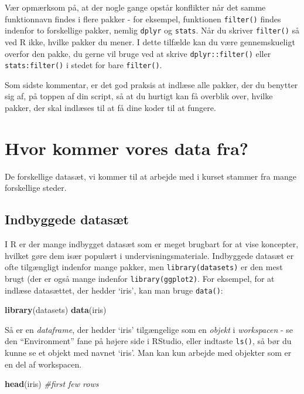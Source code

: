 \documentclass[
]{book}
\newenvironment{Shaded}{\begin{snugshade}}{\end{snugshade}}
\newcommand{\CommentTok}[1]{\textcolor[rgb]{0.56,0.35,0.01}{\textit{#1}}}
\newcommand{\FunctionTok}[1]{\textcolor[rgb]{0.13,0.29,0.53}{\textbf{#1}}}
\newcommand{\NormalTok}[1]{#1}
\begin{document}
Vær opmærksom på, at der nogle gange opstår konflikter når det samme funktionnavn findes i flere pakker - for eksempel, funktionen \texttt{filter()} findes indenfor to forskellige pakker, nemlig \texttt{dplyr} og \texttt{stats}. Når du skriver \texttt{filter()} så ved R ikke, hvilke pakker du mener. I dette tilfælde kan du være gennemskueligt overfor den pakke, du gerne vil bruge ved at skrive \texttt{dplyr::filter()} eller \texttt{stats:filter()} i stedet for bare \texttt{filter()}.

Som sidste kommentar, er det god praksis at indlæse alle pakker, der du benytter sig af, på toppen af din script, så at du hurtigt kan få overblik over, hvilke pakker, der skal indlæses til at få dine koder til at fungere.

\section{Hvor kommer vores data fra?}\label{hvor-kommer-vores-data-fra}

De forskellige datasæt, vi kommer til at arbejde med i kurset stammer fra mange forskellige steder.

\subsection{Indbyggede datasæt}\label{indbyggede-datasuxe6t}

I R er der mange indbygget datasæt som er meget brugbart for at vise koncepter, hvilket gøre dem især populært i undervisningsmateriale. Indbyggede datasæt er ofte tilgængligt indenfor mange pakker, men \texttt{library(datasets)} er den mest brugt (der er også mange indenfor \texttt{library(ggplot2)}. For eksempel, for at indlæse datasættet, der hedder `iris', kan man bruge \texttt{data()}:

\begin{Shaded}
\begin{Highlighting}[]
\FunctionTok{library}\NormalTok{(datasets)}
\FunctionTok{data}\NormalTok{(iris)}
\end{Highlighting}
\end{Shaded}

Så er en \emph{dataframe}, der hedder `iris' tilgængelige som en \emph{objekt} i \emph{workspacen} - se den ``Environment'' fane på højere side i RStudio, eller indtaste \texttt{ls()}, så bør du kunne se et objekt med navnet `iris'. Man kan kun arbejde med objekter som er en del af workspacen.

\begin{Shaded}
\begin{Highlighting}[]
\FunctionTok{head}\NormalTok{(iris) }\CommentTok{\#first few rows}
\end{Highlighting}
\end{Shaded}
\end{document}
